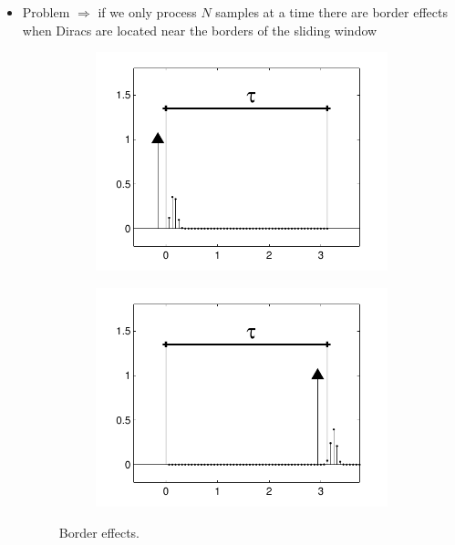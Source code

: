 \documentclass[8pt]{beamer}
\begin{document}
\begin{frame}
\begin{itemize}
\item<3-> Problem $\Rightarrow$ if we only process $N$ samples at a time there are border 
effects when Diracs are located near the borders of the sliding window
\begin{figure}[h]
\begin{subfigure}{.25\textwidth}
\includegraphics[width=\linewidth]{figures/border_effect_left}
\end{subfigure}
\begin{subfigure}{.25\textwidth}
\includegraphics[width=\linewidth]{figures/border_effect_right}
\end{subfigure}
\caption{Border effects.}
\end{figure}

\end{itemize}

\end{frame}
\end{document}
